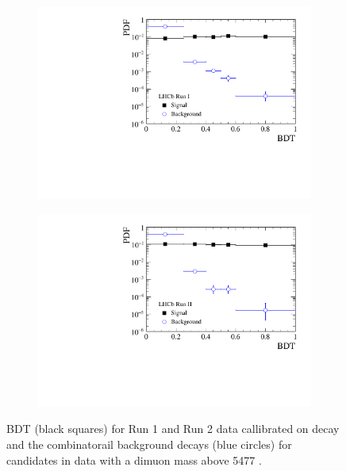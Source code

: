 \begin{figure}[htbp]
    \centering
   \begin{subfigure}[b]{0.48\textwidth}
        \includegraphics[width= \textwidth]{./Figs/BFAnalysis/C_macros/BDT_calibration_Run1.pdf}
    \end{subfigure}
    \begin{subfigure}[b]{0.48\textwidth}
       \includegraphics[width=\textwidth]{./Figs/BFAnalysis/C_macros/BDT_calibration_Run2.pdf}
   \end{subfigure}
    \caption{\bmumu BDT \pdfs (black squares) for Run 1 and Run 2 data callibrated on \bdkpi decay and the combinatorail background decays (blue circles) for \bmumu candidates in data with a dimuon mass above 5477 \mevcc. }
    \label{fig:BDTpdfs}
\end{figure}


